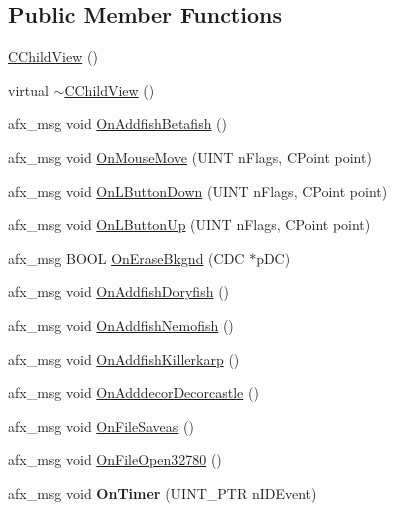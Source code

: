 \subsection*{Public Member Functions}
\begin{DoxyCompactItemize}
\item 
\mbox{\hyperlink{class_c_child_view_aff5af7c162c10755edbe58f260ded6d4}{C\+Child\+View}} ()
\item 
virtual \mbox{\hyperlink{class_c_child_view_a5b033b5e0a130950719a173b86418698}{$\sim$\+C\+Child\+View}} ()
\item 
afx\+\_\+msg void \mbox{\hyperlink{class_c_child_view_ad05faefbdb17d1c73f85de75b01a1ac1}{On\+Addfish\+Betafish}} ()
\item 
afx\+\_\+msg void \mbox{\hyperlink{class_c_child_view_ad3cb2f8d9fa9a6fb06989513dee5a8bc}{On\+Mouse\+Move}} (U\+I\+NT n\+Flags, C\+Point point)
\item 
afx\+\_\+msg void \mbox{\hyperlink{class_c_child_view_af513a57c45ce8b9dcc09dd934e228534}{On\+L\+Button\+Down}} (U\+I\+NT n\+Flags, C\+Point point)
\item 
afx\+\_\+msg void \mbox{\hyperlink{class_c_child_view_ae81948a77ebf3744bd0f9449af57ee21}{On\+L\+Button\+Up}} (U\+I\+NT n\+Flags, C\+Point point)
\item 
afx\+\_\+msg B\+O\+OL \mbox{\hyperlink{class_c_child_view_a6060e6d09d522d345dcee5a01d41c1f0}{On\+Erase\+Bkgnd}} (C\+DC $\ast$p\+DC)
\item 
afx\+\_\+msg void \mbox{\hyperlink{class_c_child_view_acb27b77bb4d6f4997c7d2d94f1a4e14c}{On\+Addfish\+Doryfish}} ()
\item 
afx\+\_\+msg void \mbox{\hyperlink{class_c_child_view_a6fddae71d821dd64cfae1359e8a33a62}{On\+Addfish\+Nemofish}} ()
\item 
afx\+\_\+msg void \mbox{\hyperlink{class_c_child_view_a0d3175bb87c2e24572d6c0364abebd07}{On\+Addfish\+Killerkarp}} ()
\item 
afx\+\_\+msg void \mbox{\hyperlink{class_c_child_view_aaf8f6acf9df7bdfa17f9dfcfa60d7883}{On\+Adddecor\+Decorcastle}} ()
\item 
afx\+\_\+msg void \mbox{\hyperlink{class_c_child_view_a2f79325c40f3a93227e60498b2135785}{On\+File\+Saveas}} ()
\item 
afx\+\_\+msg void \mbox{\hyperlink{class_c_child_view_a6e69d915eea1631da5f8a8d8d5a2c101}{On\+File\+Open32780}} ()
\item 
\mbox{\label{class_c_child_view_a4c6bb8bd631cee84bb80c948f3d6d98a}} 
afx\+\_\+msg void {\bfseries On\+Timer} (U\+I\+N\+T\+\_\+\+P\+TR n\+I\+D\+Event)
\end{DoxyCompactItemize}
